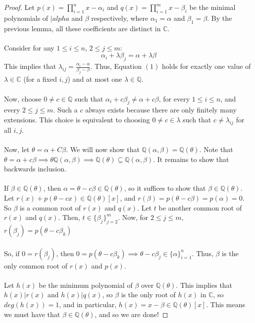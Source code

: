 \documentclass{article}
\newcommand{\C}{\mathbb{C}}
\newcommand{\Q}{\mathbb{Q}}
\begin{document}
\begin{proof}
Let $p(x)=\displaystyle\prod_{i=1}^n x-\alpha_i$ and $q(x)=\displaystyle\prod_{i=1}^m x-\beta_i$ be the minimal polynomials of $|alpha$ and $\beta$ respectively, where $\alpha_1=\alpha$ and $\beta_1=\beta$. By the previous lemma, all these coefficients are distinct in $\C$. \\
\\
\noindent Consider for any $1\leq i\leq n$, $2\leq j\leq m$:
\begin{equation}
\alpha_i+\lambda\beta_j = \alpha+\lambda \beta
\end{equation}
This implies that $\lambda_{ij} = \frac{\alpha_i-\alpha}{\beta_j-\beta}$. Thus, Equation $(1)$ holds for exactly one value of $\lambda\in\C$ (for a fixed $i,j$) and at most one $\lambda\in\Q$. \\
\\
Now, choose $0\neq c\in\Q$ such that $\alpha_i+c\beta_j\neq \alpha + c\beta$, for every $1\leq i\leq n $, and every $2\leq j \leq m$. Such a $c$ always exists because there are only finitely many extensions. This choice is equivalent to choosing $0\neq c\in\lambda$ such that $c\neq \lambda_{ij}$ for all $i,j$. \\
\\
Now, let $\theta=\alpha+C\beta$. We will now show that $\Q(\alpha,\beta)=\Q(\theta)$. Note that $\theta=\alpha+c\beta\implies \theta\Q(\alpha,\beta)\implies \Q(\theta)\subseteq \Q(\alpha,\beta)$. It remains to show that backwards inclusion. \\
\\
If $\beta\in \Q(\theta)$, then $\alpha=\theta-c\beta\in\Q(\theta)$, so it suffices to show that $\beta\in\Q(\theta)$. Let $r(x)+p(\theta-cx)\in \Q(\theta)[x]$, and $r(\beta)=p(\theta-c\beta)=p(\alpha)=0$. So $\beta$ is a common root of $r(x)$ and $q(x)$. Let $t$ be another common root of $r(x)$ and $q(x)$. Then, $t\in\{\beta_j\}_{j=2}^m$. Now, for $2\leq j\leq m$, $r(\beta_j)=p(\theta-c\beta_k)$\\ \\
\noindent So, if $0=r(\beta_j)$, then $0=p(\theta-c\beta_k)\implies \theta-c\beta_j\in\{\alpha\}_{i=1}^n$. Thus, $\beta$ is the only common root of $r(x)$ and $p(x)$. \\
\\
Let $h(x)$ be the minimum polynomial of $\beta$ over $\Q(\theta)$. This implies that $h(x)|r(x)$ and $h(x)|q(x)$, so $\beta$ is the only root of $h(x)$ in $\C$, so $deg(h(x))=1$, and in particular, $h(x)=x-\beta\in \Q(\theta)[x]$. This means we must have that $\beta\in\Q(\theta)$, and so we are done! 
\end{proof}
\end{document}

